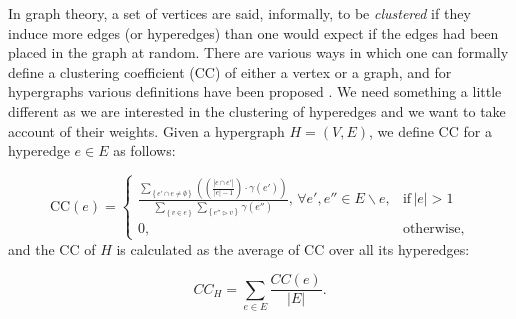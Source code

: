 \documentclass[twocolumn]{svjour3}          \smartqed
\begin{document}
In graph theory, a set of vertices are said, informally, to be \textit{clustered} if they induce more edges (or hyperedges) than one would expect if the edges had been placed in the graph at random.  There are various ways in which one can formally define a clustering coefficient (CC) of either a vertex or a graph, and for hypergraphs various definitions have been proposed \cite{gavin2002functional,klamt2009hypergraphs,latapy2008basic}.  We need something a little different as we are interested in the clustering of hyperedges and we want to take account of their weights.  Given a hypergraph $H=(V,E)$, we define {CC} for a hyperedge $e \in E$ as follows:

\begin{dmath}\label{eq:cc}
\text{CC}(e) =
\begin{cases}
 \frac{\sum\nolimits_{\left\lbrace e' \cap e \neq \emptyset \right\rbrace} \left( \left( \frac{\left\vert {e \cap e'} \right\vert}{\left\vert {e} \right\vert-1} \right) \cdot \gamma(e') \right)}{\sum\nolimits_{\left\lbrace v \in e \right\rbrace} \sum\nolimits_{\left\lbrace e'' \triangleright v \right\rbrace } \gamma(e'')}, \, \forall e',e'' \in E \backslash e, & \mbox{if} \, \left\vert {e} \right\vert >1 \\
 0, & \mbox{otherwise},
\end{cases}
\end{dmath}
and the CC of $H$ is calculated as the average of CC over all its hyperedges: 

\begin{equation}\label{eq:cc_hgraph}
{CC}_{H} = \sum_{e \in E} {\frac{CC(e)}{\vert E \vert}}.
\end{equation}
\end{document}
